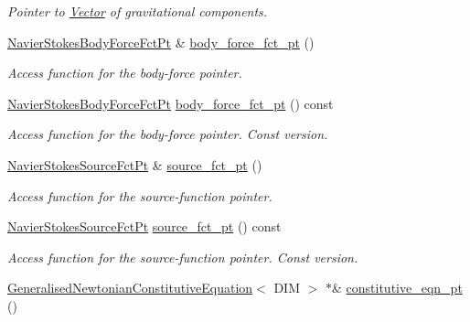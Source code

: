 \begin{DoxyCompactItemize}
\begin{DoxyCompactList}\small\item\em Pointer to \hyperlink{classoomph_1_1Vector}{Vector} of gravitational components. \end{DoxyCompactList}\item 
\hyperlink{classoomph_1_1GeneralisedNewtonianNavierStokesEquations_a0076b2b1b6ad17d306907c959b3f4d12}{Navier\+Stokes\+Body\+Force\+Fct\+Pt} \& \hyperlink{classoomph_1_1GeneralisedNewtonianNavierStokesEquations_aaa4bbed453f5e562f321874510e51e48}{body\+\_\+force\+\_\+fct\+\_\+pt} ()
\begin{DoxyCompactList}\small\item\em Access function for the body-\/force pointer. \end{DoxyCompactList}\item 
\hyperlink{classoomph_1_1GeneralisedNewtonianNavierStokesEquations_a0076b2b1b6ad17d306907c959b3f4d12}{Navier\+Stokes\+Body\+Force\+Fct\+Pt} \hyperlink{classoomph_1_1GeneralisedNewtonianNavierStokesEquations_a0fc8b1056896bf107383739c3ac94d7d}{body\+\_\+force\+\_\+fct\+\_\+pt} () const
\begin{DoxyCompactList}\small\item\em Access function for the body-\/force pointer. Const version. \end{DoxyCompactList}\item 
\hyperlink{classoomph_1_1GeneralisedNewtonianNavierStokesEquations_a817ff3b87362e53bf1d0594723b84573}{Navier\+Stokes\+Source\+Fct\+Pt} \& \hyperlink{classoomph_1_1GeneralisedNewtonianNavierStokesEquations_ac04b91f61649005866f7108ad8f3ce19}{source\+\_\+fct\+\_\+pt} ()
\begin{DoxyCompactList}\small\item\em Access function for the source-\/function pointer. \end{DoxyCompactList}\item 
\hyperlink{classoomph_1_1GeneralisedNewtonianNavierStokesEquations_a817ff3b87362e53bf1d0594723b84573}{Navier\+Stokes\+Source\+Fct\+Pt} \hyperlink{classoomph_1_1GeneralisedNewtonianNavierStokesEquations_a4eedc35ec748d295668845f68ed8ebec}{source\+\_\+fct\+\_\+pt} () const
\begin{DoxyCompactList}\small\item\em Access function for the source-\/function pointer. Const version. \end{DoxyCompactList}\item 
\hyperlink{classoomph_1_1GeneralisedNewtonianConstitutiveEquation}{Generalised\+Newtonian\+Constitutive\+Equation}$<$ D\+IM $>$ $\ast$\& \hyperlink{classoomph_1_1GeneralisedNewtonianNavierStokesEquations_a4b894ab704ed76af34948e17045e0a2a}{constitutive\+\_\+eqn\+\_\+pt} ()

\end{DoxyCompactItemize}
